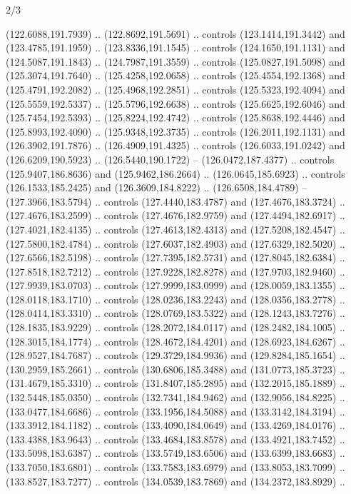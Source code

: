 \begin{flagdescription}{2/3}
\begin{scope}[shift={(0.5\flaglength,0.5)},scale=\flagwidth/320]
\begin{scope}[y=0.8pt, x=0.8pt, yscale=-1,shift={(-118.3,-146)}]
  (122.6088,191.7939) .. (122.8692,191.5691) .. controls (123.1414,191.3442) and
  (123.4785,191.1959) .. (123.8336,191.1545) .. controls (124.1650,191.1131) and
  (124.5087,191.1843) .. (124.7987,191.3559) .. controls (125.0827,191.5098) and
  (125.3074,191.7640) .. (125.4258,192.0658) .. controls (125.4554,192.1368) and
  (125.4791,192.2082) .. (125.4968,192.2851) .. controls (125.5323,192.4094) and
  (125.5559,192.5337) .. (125.5796,192.6638) .. controls (125.6625,192.6046) and
  (125.7454,192.5393) .. (125.8224,192.4742) .. controls (125.8638,192.4446) and
  (125.8993,192.4090) .. (125.9348,192.3735) .. controls (126.2011,192.1131) and
  (126.3902,191.7876) .. (126.4909,191.4325) .. controls (126.6033,191.0242) and
  (126.6209,190.5923) .. (126.5440,190.1722) -- (126.0472,187.4377) .. controls
  (125.9407,186.8636) and (125.9462,186.2664) .. (126.0645,185.6923) .. controls
  (126.1533,185.2425) and (126.3609,184.8222) .. (126.6508,184.4789) --
  (127.3966,183.5794) .. controls (127.4440,183.4787) and (127.4676,183.3724) ..
  (127.4676,183.2599) .. controls (127.4676,182.9759) and (127.4494,182.6917) ..
  (127.4021,182.4135) .. controls (127.4613,182.4313) and (127.5208,182.4547) ..
  (127.5800,182.4784) .. controls (127.6037,182.4903) and (127.6329,182.5020) ..
  (127.6566,182.5198) .. controls (127.7395,182.5731) and (127.8045,182.6384) ..
  (127.8518,182.7212) .. controls (127.9228,182.8278) and (127.9703,182.9460) ..
  (127.9939,183.0703) .. controls (127.9999,183.0999) and (128.0059,183.1355) ..
  (128.0118,183.1710) .. controls (128.0236,183.2243) and (128.0356,183.2778) ..
  (128.0414,183.3310) .. controls (128.0769,183.5322) and (128.1243,183.7276) ..
  (128.1835,183.9229) .. controls (128.2072,184.0117) and (128.2482,184.1005) ..
  (128.3015,184.1774) .. controls (128.4672,184.4201) and (128.6923,184.6267) ..
  (128.9527,184.7687) .. controls (129.3729,184.9936) and (129.8284,185.1654) ..
  (130.2959,185.2661) .. controls (130.6806,185.3488) and (131.0773,185.3723) ..
  (131.4679,185.3310) .. controls (131.8407,185.2895) and (132.2015,185.1889) ..
  (132.5448,185.0350) .. controls (132.7341,184.9462) and (132.9056,184.8225) ..
  (133.0477,184.6686) .. controls (133.1956,184.5088) and (133.3142,184.3194) ..
  (133.3912,184.1182) .. controls (133.4090,184.0649) and (133.4269,184.0176) ..
  (133.4388,183.9643) .. controls (133.4684,183.8578) and (133.4921,183.7452) ..
  (133.5098,183.6387) .. controls (133.5749,183.6506) and (133.6399,183.6683) ..
  (133.7050,183.6801) .. controls (133.7583,183.6979) and (133.8053,183.7099) ..
  (133.8527,183.7277) .. controls (134.0539,183.7869) and (134.2372,183.8929) ..

\end{scope}
\end{scope}
\end{flagdescription}

